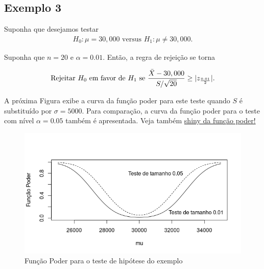 \documentclass[12pt]{beamer}
\begin{document}
\subsection{Exemplo 3}
\begin{frame}{}
\begin{block}{}
\justifying
Suponha que desejamos testar
\begin{align}
H_0 : \mu = 30,000 \text{ versus } H_1 : \mu \neq 30,000. 
\end{align}

Suponha que $n = 20$ e $\alpha = 0.01$. Então, a regra de rejeição se torna

\begin{align}
\text{Rejeitar } H_0 \text{ em favor de } H_1 \text{ se } \frac{\Bar{X} - 30,000}{S/\sqrt{20}} \geq |z_{\frac{0.01}{2}}|.
\end{align}

A próxima Figura exibe a curva da função poder para este teste quando $S$ é substituído por $\sigma = 5000$. Para comparação, a curva da função poder para o teste com nível $\alpha = 0.05$ também é apresentada. Veja também \href{https://est711.shinyapps.io/FuncaoPoder/}{shiny da função poder!}
\end{block}
\end{frame}


\begin{frame}{}
\begin{block}{}
\justifying
\begin{figure}
    \centering
    \includegraphics[scale=0.6]{figs/FunctionPower.png}
    \caption{Função Poder para o teste de hipótese do exemplo}
    \label{fig:enter-label}
\end{figure}
\end{block}
\end{frame}
\end{document}
